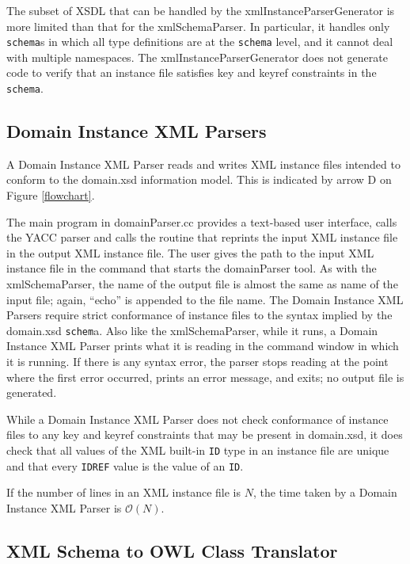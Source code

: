 \documentclass[preprint,12pt]{elsarticle}
\begin{document}
The subset of XSDL that can be handled by the xmlInstanceParserGenerator is
more limited than that for the xmlSchemaParser. In particular, it handles
only {\tt schema}s in which all type definitions are at the {\tt schema}
level, and it cannot deal with multiple namespaces. The
xmlInstanceParserGenerator does not generate code to verify that an
instance file satisfies key and keyref constraints in the {\tt schema}.

\subsection{Domain Instance XML Parsers}
\label{instanceXMLParser}

A Domain Instance XML Parser reads and writes XML instance files intended
to conform to the domain.xsd information model. This is indicated by arrow
D on Figure \ref{flowchart}.

The main program in domainParser.cc provides a text-based user interface,
calls the YACC parser and calls the routine that reprints the input XML
instance file in the output XML instance file. The user gives the path to
the input XML instance file in the command that starts the domainParser
tool. As with the xmlSchemaParser, the name of the output file is almost
the same as name of the input file; again, ``echo'' is appended to the file
name. The Domain Instance XML Parsers require strict conformance of
instance files to the syntax implied by the domain.xsd {\tt schem}a. Also
like the xmlSchemaParser, while it runs, a Domain Instance XML Parser
prints what it is reading in the command window in which it is running. If
there is any syntax error, the parser stops reading at the point where the
first error occurred, prints an error message, and exits; no output file is
generated.

While a Domain Instance XML Parser does not check conformance of instance
files to any key and keyref constraints that may be present in domain.xsd,
it does check that all values of the XML built-in {\tt ID} type in an
instance file are unique and that every {\tt IDREF} value is the value of
an {\tt ID}.

If the number of lines in an XML instance file is ${N}$, the time taken by
a Domain Instance XML Parser is $\mathcal{O}{(N)}$.

\subsection{XML Schema to OWL Class Translator}
\label{schemaToOWL}
\end{document}
